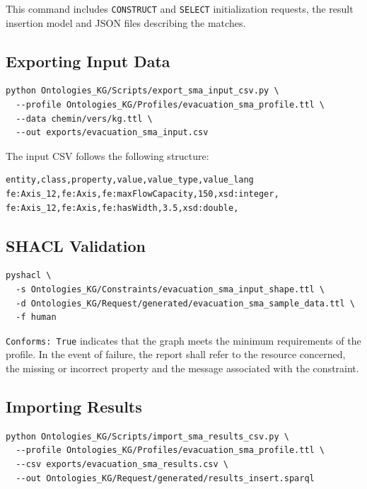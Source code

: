 \documentclass{article}
\begin{document}
This command includes \texttt{CONSTRUCT} and \texttt{SELECT} initialization requests, the result insertion model and JSON files describing the matches.

\subsection{Exporting Input Data}

\begin{lstlisting}
python Ontologies_KG/Scripts/export_sma_input_csv.py \
  --profile Ontologies_KG/Profiles/evacuation_sma_profile.ttl \
  --data chemin/vers/kg.ttl \
  --out exports/evacuation_sma_input.csv
\end{lstlisting}

The input CSV follows the following structure:

\begin{lstlisting}
entity,class,property,value,value_type,value_lang
fe:Axis_12,fe:Axis,fe:maxFlowCapacity,150,xsd:integer,
fe:Axis_12,fe:Axis,fe:hasWidth,3.5,xsd:double,
\end{lstlisting}

\subsection{SHACL Validation}

\begin{lstlisting}
pyshacl \
  -s Ontologies_KG/Constraints/evacuation_sma_input_shape.ttl \
  -d Ontologies_KG/Request/generated/evacuation_sma_sample_data.ttl \
  -f human
\end{lstlisting}

\texttt{Conforms: True} indicates that the graph meets the minimum requirements of the profile. In the event of failure, the report shall refer to the resource concerned, the missing or incorrect property and the message associated with the constraint.

\subsection{Importing Results}

\begin{lstlisting}
python Ontologies_KG/Scripts/import_sma_results_csv.py \
  --profile Ontologies_KG/Profiles/evacuation_sma_profile.ttl \
  --csv exports/evacuation_sma_results.csv \
  --out Ontologies_KG/Request/generated/results_insert.sparql
\end{lstlisting}
\end{document}

